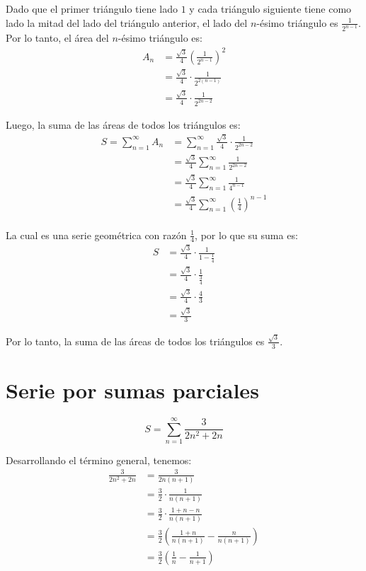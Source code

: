 \documentclass{article}
\begin{document}
Dado que el primer triángulo tiene lado $1$ y cada triángulo siguiente tiene como lado la mitad del lado del triángulo anterior, el lado del $n$-ésimo triángulo es $\frac{1}{2^{n-1}}$. Por lo tanto, el área del $n$-ésimo triángulo es:
\begin{align*}
A_n &= \frac{\sqrt{3}}{4} \left(\frac{1}{2^{n-1}}\right)^2 \\
&= \frac{\sqrt{3}}{4} \cdot \frac{1}{2^{2(n-1)}}\\
&= \frac{\sqrt{3}}{4} \cdot \frac{1}{2^{2n-2}}
\end{align*}

Luego, la suma de las áreas de todos los triángulos es:
\begin{align*}
S = \sum_{n=1}^{\infty} A_n &= \sum_{n=1}^{\infty} \frac{\sqrt{3}}{4} \cdot \frac{1}{2^{2n-2}}\\
&= \frac{\sqrt{3}}{4} \sum_{n=1}^{\infty} \frac{1}{2^{2n-2}}\\
&= \frac{\sqrt{3}}{4} \sum_{n=1}^{\infty} \frac{1}{4^{n-1}}\\
&= \frac{\sqrt{3}}{4} \sum_{n=1}^{\infty} \left(\frac{1}{4}\right)^{n-1}\\
\end{align*}

La cual es una serie geométrica con razón $\frac{1}{4}$, por lo que su suma es:
\begin{align*}
S &= \frac{\sqrt{3}}{4} \cdot \frac{1}{1 - \frac{1}{4}}\\
&= \frac{\sqrt{3}}{4} \cdot \frac{1}{\frac{3}{4}}\\
&= \frac{\sqrt{3}}{4} \cdot \frac{4}{3}\\
&= \boxed{\frac{\sqrt{3}}{3}}
\end{align*}

Por lo tanto, la suma de las áreas de todos los triángulos es $\frac{\sqrt{3}}{3}$.

\section{Serie por sumas parciales}

\[
S = \sum_{n=1}^{\infty} \frac{3}{2n^2 + 2n}
\]

Desarrollando el término general, tenemos:
\begin{align*}
\frac{3}{2n^2 + 2n} &= \frac{3}{2n(n+1)}\\
&= \frac{3}{2} \cdot \frac{1}{n(n+1)}\\
&= \frac{3}{2} \cdot \frac{1+n-n}{n(n+1)}\\
&= \frac{3}{2} \left(\frac{1 + n}{n(n+1)} - \frac{n}{n(n+1)}\right)\\
&= \frac{3}{2} \left(\frac{1}{n} - \frac{1}{n+1}\right)
\end{align*}
\end{document}
